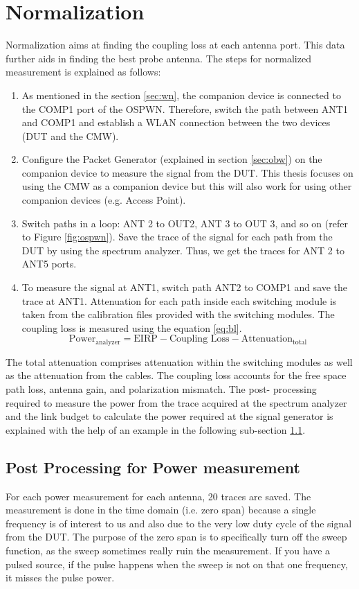 \section{Normalization} \label{sec:11}
Normalization aims at finding the coupling loss at each antenna port. This data further aids in finding the best probe antenna. The steps for normalized measurement is explained as follows:
\begin{enumerate}
\item As mentioned in the section \ref{sec:wn}, the companion device is connected to the COMP1 port of the OSPWN. Therefore, switch the path between ANT1 and COMP1 and establish a \acs{WLAN} connection between the two devices (\acs{DUT} and the \acs{CMW}). 
\item Configure the Packet Generator (explained in section \ref{sec:obw}) on the companion device to measure the signal from the \acs{DUT}. This thesis focuses on using the CMW as a companion device but this will also work for using other companion devices (e.g. Access Point).
\item Switch paths in a loop: ANT 2 to OUT2, ANT 3 to OUT 3, and so on (refer to Figure \ref{fig:ospwn}). Save the trace of the signal for each path from the \acs{DUT} by using the spectrum analyzer. Thus, we get the traces for ANT 2 to ANT5 ports.
\item To measure the signal at ANT1, switch path ANT2 to COMP1 and save the trace at ANT1. Attenuation for each path inside each switching module is taken from the calibration files provided with the switching modules. The coupling loss is measured using the equation \ref{eq:bl}.
\begin{equation}
\mbox{Power}_{\mbox{analyzer}}  = \mbox{EIRP} - \mbox{Coupling Loss} - \mbox{Attenuation}_{\mbox{total}}  \label{eq:bl}
\end{equation}
\end{enumerate}
The total attenuation comprises attenuation within the switching modules as well as the attenuation from the cables. The coupling loss accounts for the free space path loss, antenna gain, and polarization mismatch. The post- processing required to measure the power from the trace acquired at the spectrum analyzer and the link budget to calculate the power required at the signal generator is explained with the help of an example in the following sub-section \ref{sec:abc}.

\subsection{Post Processing for Power measurement} \label{sec:abc}
For each power measurement for each antenna, 20 traces are saved. The measurement is done in the time domain (i.e. zero span) because a single frequency is of interest to us and also due to the very low duty cycle of the signal from the \acs{DUT}. The purpose of the zero span is to specifically turn off the sweep function, as the sweep sometimes really ruin the measurement. If you have a pulsed source, if the pulse happens when the sweep is not on that one frequency, it misses the pulse power.\\

